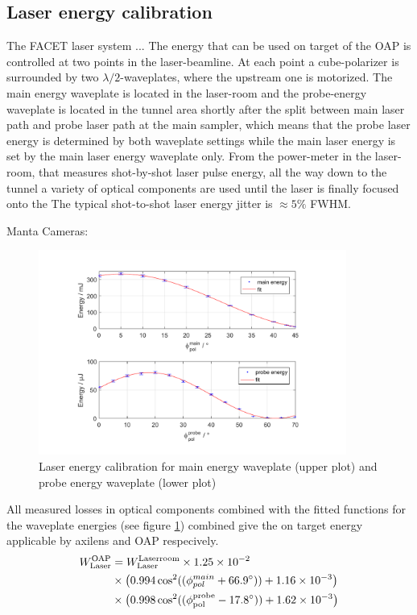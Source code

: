 \subsection{Laser energy calibration}
The FACET laser system ...
The energy that can be used on target of the OAP is controlled at two points in the laser-beamline.
At each point a cube-polarizer is surrounded by two  $\lambda/2$-waveplates, where the upstream one is motorized.
The main energy waveplate is located in the laser-room and the probe-energy waveplate is located in the tunnel area shortly after the split between main laser path and probe laser path at the main sampler, which means that the probe laser energy is determined by both waveplate settings while the main laser energy is set by the main laser energy waveplate only. From the power-meter in the laser-room, that measures shot-by-shot laser pulse energy, all the way down to the tunnel a variety of optical components are used until the laser is finally focused onto the 
The typical shot-to-shot laser energy jitter  is $\approx 5 \%$ FWHM.

Manta Cameras: \cite{GigE125_datasheet}

\begin{figure}[htbp]
\includegraphics[width=0.9\textwidth]{experiment/images/edited/waveplate_calibration.pdf}
\caption{Laser energy calibration for main energy waveplate (upper plot) and probe energy waveplate (lower plot)}
\label{img:LaserEnergyCalib}
\end{figure}

All measured losses in optical components combined with the fitted functions for the waveplate energies (see figure \ref{img:LaserEnergyCalib}) combined give the on target energy applicable by axilens and OAP respecively.
\begin{align*}
 W_\mathrm{Laser}^\mathrm{OAP} &= W_\mathrm{Laser}^\mathrm{Laserroom}\times 1.25\times10^{-2}\\ 
 &\times\big( 0.994 \cos^2((\phi_{pol}^{main}+66.9\degree)) +1.16\times 10^{-3}\big)\\
  &\times \big(0.998 \cos^2((\phi_\mathrm{pol}^\mathrm{probe}-17.8\degree )) +1.62\times 10^{-3}\big)
\end{align*}

